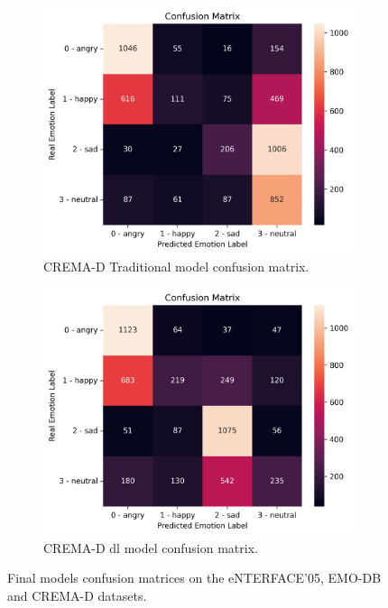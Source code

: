 \begin{figure}[H]
	\begin{subfigure}{.5\textwidth}
		\centering
		\includegraphics[width=\linewidth]{figs/4_5_discussion/cre_trad_cm.png}
		\caption{CREMA-D Traditional model confusion matrix.}
	\end{subfigure}%
	\begin{subfigure}{.5\textwidth}
		\centering
		\includegraphics[width=\linewidth]{figs/4_5_discussion/cre_deep_cm.png}
		\caption{CREMA-D \ac{dl} model confusion matrix.}
	\end{subfigure}
	\caption{Final models confusion matrices on the eNTERFACE'05, EMO-DB and CREMA-D datasets.}
	\label{fig:final_cm}
\end{figure}


